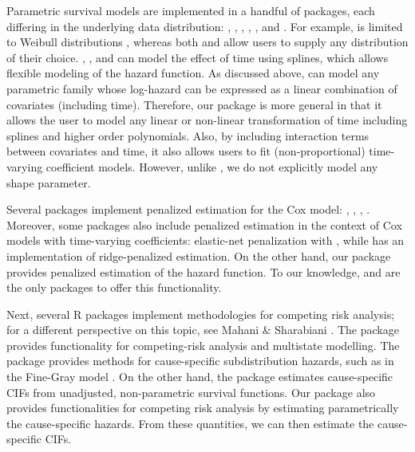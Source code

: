 Parametric survival models are implemented in a handful of packages,
each differing in the underlying data distribution: 
\citeyearpar{mahani2015bayesian}, 
\citeyearpar{flexsurv}, 
\citeyearpar{smoothHazard},  \citeyearpar{clements_liu},
 \citeyearpar{scheike2014estimating}, and
 \citeyearpar{survival-package}. For example,
 is limited to Weibull distributions
\citeyearpar{smoothHazard}, whereas both  and
 allow users to supply any distribution of their choice.
, ,  and  can
model the effect of time using splines, which allows flexible modeling
of the hazard function. As discussed above,  can model any
parametric family whose log-hazard can be expressed as a linear
combination of covariates (including time). Therefore, our package is
more general in that it allows the user to model any linear or
non-linear transformation of time including splines and higher order
polynomials. Also, by including interaction terms between covariates and
time, it also allows users to fit (non-proportional) time-varying
coefficient models. However, unlike , we do not explicitly
model any shape parameter.

Several packages implement penalized estimation for the Cox model:
 \citeyearpar{regpathcox}, 
\citeyearpar{park_hastie},  \citeyearpar{l1penal},
 \citeyearpar{gerds_blanche}. Moreover, some
packages also include penalized estimation in the context of Cox models
with time-varying coefficients: elastic-net penalization with
 \citeyearpar{clements_liu}, while 
\citeyearpar{survival-package} has an implementation of ridge-penalized
estimation. On the other hand, our package  provides
penalized estimation of the hazard function. To our knowledge,
 and  are the only packages to offer this
functionality.

Next, several R packages implement methodologies for competing risk
analysis; for a different perspective on this topic, see Mahani \&
Sharabiani \citeyearpar{mahani2015bayesian}. The package 
provides functionality for competing-risk analysis and multistate
modelling. The package  provides methods for
cause-specific subdistribution hazards, such as in the Fine-Gray model
\citeyearpar{fine1999proportional}. On the other hand, the package
 estimates cause-specific CIFs from unadjusted, non-parametric
survival functions. Our package  also provides
functionalities for competing risk analysis by estimating parametrically
the cause-specific hazards. From these quantities, we can then estimate
the cause-specific CIFs.


